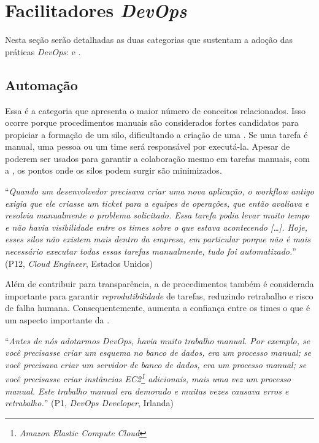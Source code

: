 \section{Facilitadores \emph{DevOps}}\label{secao_facilitadores}

Nesta seção serão detalhadas as duas categorias que sustentam a adoção das práticas
{\it DevOps}:  e .

\subsection{Automação} \label{ssec:automation}

Essa é a categoria que apresenta o maior número de conceitos relacionados. Isso
ocorre porque procedimentos manuais são considerados fortes candidatos para
propiciar a formação de um silo, dificultando a criação de uma \cc. Se uma tarefa
é manual, uma pessoa ou um time será responsável por executá-la. Apesar de
 poderem ser usados para garantir a
colaboração mesmo em tarefas manuais, com a , os pontos onde os
silos podem surgir são minimizados.

\begin{mq}
``\emph{Quando um desenvolvedor precisava criar uma nova aplicação, o workflow
antigo exigia que ele criasse um ticket para a equipes de operações, que então
avaliava e resolvia manualmente o problema solicitado. Essa tarefa podia levar
muito tempo e não havia visibilidade entre os times sobre o que estava
acontecendo [\ldots]. Hoje, esses silos não existem mais dentro da empresa,
em particular porque não é mais necessário executar todas essas tarefas
manualmente, tudo foi automatizado.}'' (P12, {\it Cloud Engineer}, Estados Unidos)
\end{mq}

Além de contribuir para transparência, a  de procedimentos
também é considerada importante para garantir \emph{reprodutibilidade} de
tarefas, reduzindo retrabalho e risco de falha humana. Consequentemente,
 aumenta a confiança entre os times o que é um aspecto importante
da \cc.

\begin{mq}
``\emph{Antes de nós adotarmos DevOps, havia muito trabalho manual. Por exemplo,
se você precisasse criar um esquema no banco de dados, era um processo manual;
se você precisava criar um servidor de banco de dados, era um processo manual;
se você precisasse criar instâncias EC2\footnote{{\it Amazon Elastic Compute Cloud}}
adicionais, mais uma vez um processo manual. Este trabalho manual era demorado
e muitas vezes causava erros e retrabalho.}'' (P1, {\it DevOps Developer}, Irlanda)
\end{mq}

